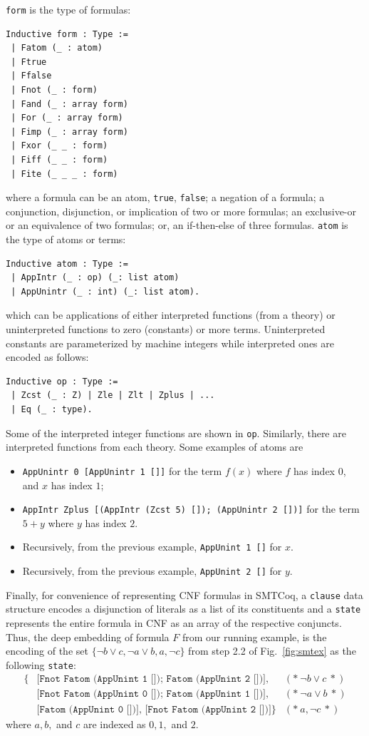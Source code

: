 \documentclass{article}
\begin{document}
	\texttt{form} is the type of 
	formulas:
	\begin{verbatim}
Inductive form : Type :=
 | Fatom (_ : atom)
 | Ftrue
 | Ffalse
 | Fnot (_ : form)
 | Fand (_ : array form)
 | For (_ : array form)
 | Fimp (_ : array form)
 | Fxor (_ _ : form)
 | Fiff (_ _ : form)
 | Fite (_ _ _ : form)
	\end{verbatim}
	where a formula can be an atom, 
	\texttt{true}, \texttt{false};
	a negation of a formula; a 
	conjunction, disjunction, or 
	implication of two or more 
	formulas; an exclusive-or or
	an equivalence of two formulas; 
	or, an if-then-else of three formulas.
	\texttt{atom} is the type of atoms
	or terms:
	\begin{verbatim}
Inductive atom : Type :=
 | AppIntr (_ : op) (_: list atom)
 | AppUnintr (_ : int) (_: list atom).	
	\end{verbatim} 
	which can be applications of 
	either interpreted functions 
	(from a theory) or uninterpreted
	functions to zero (constants) or more 
	terms. Uninterpreted constants 
	are parameterized by machine 
	integers while interpreted ones 
	are encoded as follows:
	\begin{verbatim}
Inductive op : Type :=
 | Zcst (_ : Z) | Zle | Zlt | Zplus | ...
 | Eq (_ : type).
	\end{verbatim}
	Some of the interpreted integer 
	functions are shown in \texttt{op}.
	Similarly, there are interpreted 
	functions from each theory.
	Some examples of atoms are 
	\begin{itemize}
		\item \texttt{AppUnintr 0 [AppUnintr 
			1 []]} for the term $f(x)$ where 
			$f$ has index $0$, and $x$ has 
			index $1$; 
		\item \texttt{AppIntr Zplus [(AppIntr 
			(Zcst 5) []); (AppUnintr 2 [])]} 
			for the term $5 + y$ where $y$ 
			has index $2$.
		\item Recursively, from the previous example,
			\texttt{AppUnint 
			1 []} for $x$.
		\item Recursively, from the previous example,
			\texttt{AppUnint 2 []} for $y$.
	\end{itemize}
	Finally, for convenience of representing 
	CNF formulas in SMTCoq, a \texttt{clause} 
	data structure encodes a disjunction of 
	literals as a list of its constituents 
	and a \texttt{state} represents the entire 
	formula in CNF as an array of the 
	respective conjuncts. Thus, the deep 
	embedding of formula $F$ from our running 
	example, is the encoding of the set 
	$\{\neg b \lor c, \neg a \lor b, a, 
	\neg c\}$ from step 2.2 of 
	Fig.~\ref{fig:smtex} 
	as the following \texttt{state}:
	\begin{align*}
		\{&\texttt{[Fnot Fatom (AppUnint 1 []); 
				  Fatom (AppUnint 2 [])],} &(*\ \neg b \lor c\ *)\\
		  &\texttt{[Fnot Fatom (AppUnint 0 []);
				  Fatom (AppUnint 1 [])],} &(*\ \neg a \lor b\ *)\\
		  &\texttt{[Fatom (AppUnint 0 [])],
				  [Fnot Fatom (AppUnint 2 [])]}\} &(*\ a, \neg c\ *)  
	\end{align*}
	where $a, b,$ and $c$ are indexed as 
	$0, 1,$ and $2$.
	
\end{document}
